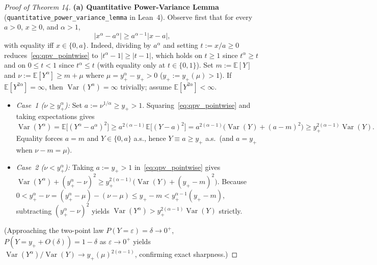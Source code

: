 \documentclass[10pt,letterpaper]{article}
\newcommand{\Var}{\operatorname{Var}}
\begin{document}
\begin{proof}[Proof of Theorem 14]
\textbf{(a) Quantitative Power-Variance Lemma} (\texttt{quantitative\_power\_variance\_lemma} in Lean~4).
Observe first that for every $a > 0$, $x \ge 0$, and $\alpha > 1$,
\begin{equation}\label{eq:qpv_pointwise}
  |x^\alpha - a^\alpha| \ge a^{\alpha - 1}|x - a|,
\end{equation}
with equality iff $x \in \{0, a\}$. Indeed, dividing by $a^\alpha$ and setting $t := x/a \ge 0$ reduces~\eqref{eq:qpv_pointwise} to $|t^\alpha - 1| \ge |t - 1|$, which holds on $t \ge 1$ since $t^\alpha \ge t$ and on $0 \le t < 1$ since $t^\alpha \le t$ (with equality only at $t \in \{0, 1\}$). Set $m := \mathbb{E}[Y]$ and $\nu := \mathbb{E}[Y^\alpha] \ge m + \mu$ where $\mu = y_+^\alpha - y_+ > 0$ ($y_+ := y_+(\mu) > 1$). If $\mathbb{E}[Y^{2\alpha}] = \infty$, then $\Var(Y^\alpha) = \infty$ trivially; assume $\mathbb{E}[Y^{2\alpha}] < \infty$.
\begin{itemize}[leftmargin=1.5em,itemsep=1.5pt]
  \item \emph{Case~1 ($\nu \ge y_+^\alpha$):} Set $a := \nu^{1/\alpha} \ge y_+ > 1$. Squaring~\eqref{eq:qpv_pointwise} and taking expectations gives
  \[
    \Var(Y^\alpha) = \mathbb{E}\bigl[(Y^\alpha - a^\alpha)^2\bigr]
    \ge a^{2(\alpha - 1)}\mathbb{E}\bigl[(Y - a)^2\bigr]
    = a^{2(\alpha - 1)}\bigl(\Var(Y) + (a - m)^2\bigr)
    \ge y_+^{2(\alpha - 1)}\Var(Y).
  \]
  Equality forces $a = m$ and $Y \in \{0, a\}$ a.s., hence $Y \equiv a \ge y_+$ a.s.\ (and $a = y_+$ when $\nu - m = \mu$).
  \item \emph{Case~2 ($\nu < y_+^\alpha$):} Taking $a := y_+ > 1$ in~\eqref{eq:qpv_pointwise} gives $\Var(Y^\alpha) + (y_+^\alpha - \nu)^2 \ge y_+^{2(\alpha - 1)}\bigl(\Var(Y) + (y_+ - m)^2\bigr)$. Because $0 < y_+^\alpha - \nu = (y_+^\alpha - \mu) - (\nu - \mu) \le y_+ - m < y_+^{\alpha - 1}(y_+ - m)$, subtracting $(y_+^\alpha - \nu)^2$ yields $\Var(Y^\alpha) > y_+^{2(\alpha - 1)}\Var(Y)$ strictly.
\end{itemize}
(Approaching the two-point law $P(Y = \varepsilon) = \delta \to 0^+$, $P(Y = y_+ + O(\delta)) = 1 - \delta$ as $\varepsilon \to 0^+$ yields $\Var(Y^\alpha)/\Var(Y) \to y_+(\mu)^{2(\alpha - 1)}$, confirming exact sharpness.)


\end{proof}
\end{document}
